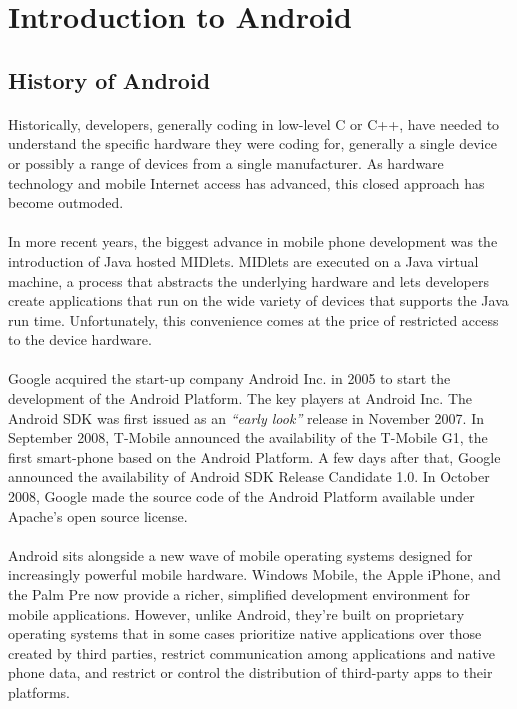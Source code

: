 \section{Introduction to Android}
\subsection{History of Android}
\paragraph{}
Historically, developers, generally coding in low-level C or C++, have needed to understand the specific hardware they were coding for, generally a single device or possibly a range of devices from a single manufacturer. As hardware technology and mobile Internet access has advanced, this closed approach has become outmoded.

\paragraph{}
In more recent years, the biggest advance in mobile phone development was the introduction of Java hosted MIDlets. MIDlets are executed on a Java virtual machine, a process that abstracts the underlying hardware and lets developers create applications that run on the wide variety of devices that supports the Java run time. Unfortunately, this convenience comes at the price of restricted access to the device hardware.

\paragraph{}
Google acquired the start-up company Android Inc. in 2005 to start the development of the Android Platform. The key players at Android Inc. The Android SDK was first issued as an \emph{“early look”} release in November 2007. In September 2008, T-Mobile announced the availability of the T-Mobile G1, the first smart-phone based on the Android Platform. A few days after that, Google announced the availability of Android SDK Release Candidate 1.0. In October 2008, Google made the source code of the Android Platform available under Apache's open source license.

\paragraph{}
Android sits alongside a new wave of mobile operating systems designed for increasingly powerful mobile hardware. Windows Mobile, the Apple iPhone, and the Palm Pre now provide a richer, simplified development environment for mobile applications. However, unlike Android, they're built on proprietary operating systems that in some cases prioritize native applications over those created by third parties, restrict communication among applications and native phone data, and restrict or control the distribution of third-party apps to their platforms.

